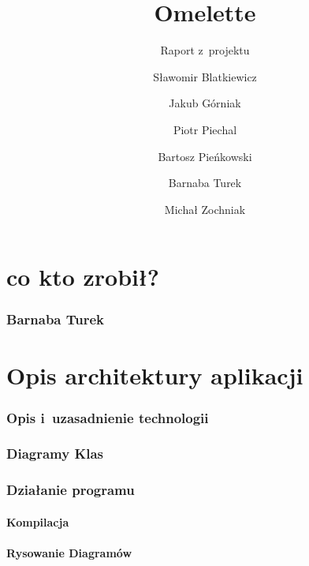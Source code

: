\documentclass[a4paper]{scrartcl}
\begin{document}
\sloppy

\title{Omelette}
\subtitle{Raport z~projektu}
\author{
  Sławomir Blatkiewicz\and
  Jakub Górniak       \and
  Piotr Piechal       \and
  Bartosz Pieńkowski  \and
  Barnaba Turek       \and
  Michał Zochniak
}
\maketitle

\part{co kto zrobił?}
\section{Barnaba Turek}


\part{Opis architektury aplikacji}
  \section{Opis i~uzasadnienie technologii}
    
  \section{Diagramy Klas}
    
  \section{Działanie programu}
    \subsection{Kompilacja}
      
    \subsection{Rysowanie Diagramów}
      
\end{document}
